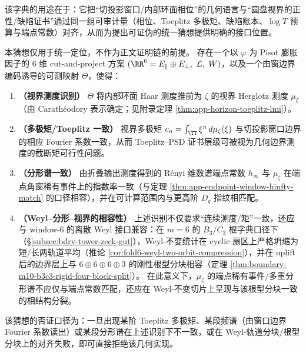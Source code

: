 该字典的用途在于：它把“切投影窗口/内部环面相位”的几何语言与“圆盘视界的正性/缺陷证书”通过同一组可审计量（相位、Toeplitz 多极矩、缺陷账本、\(\log T\) 预算与端点常数）对齐，从而为提出可证伪的统一猜想提供明确的接口位置。

\begin{conjecture}\label{conj:discussion-horizon-measure-cutproject}
本猜想仅用于统一定位，不作为正文证明链的前提。
存在一个以 \(\varphi\) 为 Pisot 膨胀因子的 \(6\) 维 cut-and-project 方案 \((\RR^6=E_{\parallel}\oplus E_{\perp},\ \mathcal{L},\ W)\)，以及一个由窗边界编码诱导的可测映射 \(\Theta\)，使得：
\begin{enumerate}
  \item \textbf{（视界测度识别）}
  \(\Theta\) 将内部环面 Haar 测度推前为 \(\zeta\) 的视界 Herglotz 测度 \(\mu_\zeta\)（由 Carath\'eodory 表示确定；见附录定理 \ref{thm:app-horizon-toeplitz-lmi}）。
  \item \textbf{（多极矩/Toeplitz 一致）}
  视界多极矩 \(c_n=\int_{\TT}\xi^n\,d\mu_\zeta(\xi)\) 与切投影窗口边界的相应 Fourier 系数一致，从而 Toeplitz--PSD 证书层级可被视为几何边界测度的截断矩可行性问题。
  \item \textbf{（分形谱一致）}
  由折叠输出测度得到的 Rényi 维数谱端点常数 \(h_\infty\) 与 \(\mu_\zeta\) 在端点角窗稀有事件上的指数率一致（与定理 \ref{thm:app-endpoint-window-hinfty-match} 的口径相容），并在可计算范围内与更高阶 \(D_q\) 指纹相匹配。
  \item \textbf{（Weyl--分形--视界的相容性）}
  上述识别不仅要求“连续测度/矩”一致，还应与 window-6 的离散 Weyl 接口兼容：在 \(m=6\) 的 \(B_3/C_3\) 根字典口径下（\S\ref{subsec:bdry-tower-zeck-gut}），Weyl-不变统计在 cyclic 扇区上严格坍缩为短/长两轨道平均（推论 \ref{cor:fold6-weyl-two-orbit-compression}），并在 uplift 后的边界层上与 \(6\oplus 6\oplus 6\oplus 3\) 的刚性根型分块相容（定理 \ref{thm:boundary-m10-b3c3-rigid-four-block-split}）。
  在此意义下，\(\mu_\zeta\) 的端点稀有事件/多重分形谱不应仅与端点常数匹配，还应在 Weyl-不变切片上呈现与该根型分块一致的相结构分裂。
\end{enumerate}
该猜想的否证口径为：一旦出现某阶 Toeplitz 多极矩、某段频谱（由窗口边界 Fourier 系数读出）或某段分形谱在上述识别下不一致，或在 Weyl-轨道分块/根型分块上的对齐失败，即可直接拒绝该几何实现。
\end{conjecture}

